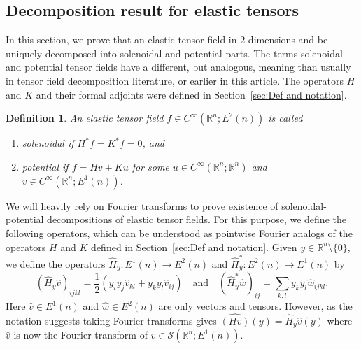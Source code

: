 \documentclass[11pt]{article}
\newtheorem{definition}[theorem]{Definition}
\begin{document}
\subsection{Decomposition result for elastic tensors}
\label{sec:elastic-decomp}

In this section, we prove that an elastic tensor field in $2$ dimensions and be uniquely decomposed into solenoidal and potential parts. The terms solenoidal and potential tensor fields have a different, but analogous, meaning than usually in tensor field decomposition literature, or earlier in this article. The operators $H$ and $K$ and their formal adjoints were defined in Section~\ref{sec:Def and notation}.

\begin{definition}
An elastic tensor field $f \in C^{\infty}(\mathbb{R}^n;E^2(n))$ is called
\begin{enumerate}
    \item solenoidal if $H^*f = K^*f = 0$, and
    \item potential if $f = Hv + Ku$ for some $u \in C^\infty(\mathbb{R}^n;\mathbb{R}^n)$ and $v \in C^\infty(\mathbb{R}^n;E^1(n))$.
\end{enumerate}
\end{definition}


We will heavily rely on Fourier transforms to prove existence of solenoidal-potential decompositions of elastic tensor fields. For this purpose, we define the following operators, which can be understood as pointwise Fourier analogs of the operators $H$ and $K$ defined in Section~\ref{sec:Def and notation}. Given $y \in \mathbb{R}^n \setminus \{0\}$, we define the operators $\widehat{H}_y \colon E^1(n) \to E^2(n)$ and $\widehat{H}^*_y \colon E^2(n) \to E^1(n)$ by
\begin{equation}
(\widehat{H}_y\widehat v)_{ijkl}
=
\frac{1}{2}(y_iy_j\widehat v_{kl} + y_ky_l\widehat v_{ij})
\quad\text{and}\quad
(\widehat{H}^*_y\widehat w)_{ij}
=
\sum_{k,l}
y_ky_l\widehat w_{ijkl}.
\end{equation}
Here $\widehat v \in E^1(n)$ and $\widehat w \in E^2(n)$ are only vectors and tensors. However, as the notation suggests taking Fourier transforms gives $\widehat{(Hv)}(y) = \widehat{H}_y\widehat v(y)$ where $\widehat v$ is now the Fourier transform of $v \in \mathcal{S}(\mathbb{R}^n;E^1(n))$.
\end{document}
